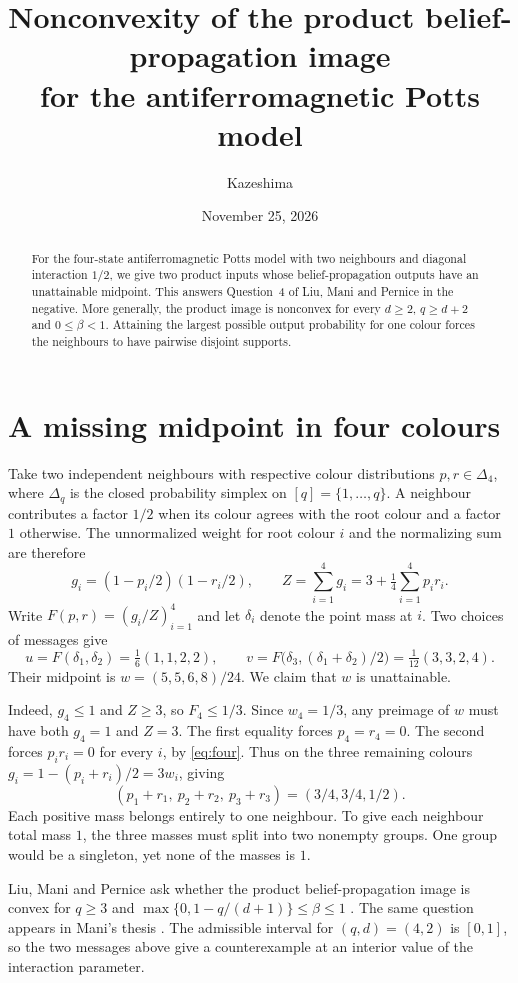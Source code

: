\documentclass[10pt,reqno]{amsart}
\title[Nonconvexity of the product Potts BP image]{Nonconvexity of the product belief-propagation image\\
for the antiferromagnetic Potts model}
\author{Kazeshima}
\date{November 25, 2026}
\begin{document}
\begin{abstract}
For the four-state antiferromagnetic Potts model with two neighbours and
diagonal interaction $1/2$, we give two product inputs whose belief-propagation
outputs have an unattainable midpoint. This answers Question~4 of Liu, Mani
and Pernice in the negative. More generally, the product image is nonconvex
for every $d\ge2$, $q\ge d+2$ and $0\le\beta<1$. Attaining the largest
possible output probability for one colour forces the neighbours to have
pairwise disjoint supports.
\end{abstract}
\maketitle

\section{A missing midpoint in four colours}

Take two independent neighbours with respective colour distributions
$p,r\in\Delta_4$, where $\Delta_q$ is the closed probability simplex on
$[q]=\{1,\ldots,q\}$. A neighbour contributes a factor $1/2$ when its
colour agrees with the root colour and a factor $1$ otherwise. The
unnormalized weight for root colour $i$ and the normalizing sum are therefore
\begin{equation}\label{eq:four}
 g_i=(1-p_i/2)(1-r_i/2),\qquad
 Z=\sum_{i=1}^4g_i=3+\tfrac14\sum_{i=1}^4p_i r_i .
\end{equation}
Write $F(p,r)=(g_i/Z)_{i=1}^4$ and let $\delta_i$ denote the point mass at $i$.
Two choices of messages give
\[
 u=F(\delta_1,\delta_2)=\tfrac16(1,1,2,2),\qquad
 v=F\bigl(\delta_3,(\delta_1+\delta_2)/2\bigr)=\tfrac1{12}(3,3,2,4).
\]
Their midpoint is $w=(5,5,6,8)/24$. We claim that $w$ is unattainable.

Indeed, $g_4\le1$ and $Z\ge3$, so $F_4\le1/3$. Since $w_4=1/3$, any
preimage of $w$ must have both $g_4=1$ and $Z=3$. The first equality
forces $p_4=r_4=0$. The second forces $p_i r_i=0$ for every $i$, by
\eqref{eq:four}. Thus on the three remaining colours
$g_i=1-(p_i+r_i)/2=3w_i$, giving
\[
 (p_1+r_1,\ p_2+r_2,\ p_3+r_3)=(3/4,3/4,1/2).
\]
Each positive mass belongs entirely to one neighbour. To give each
neighbour total mass $1$, the three masses must split into two nonempty
groups. One group would be a singleton, yet none of the masses is $1$.

Liu, Mani and Pernice ask whether the product belief-propagation image is
convex for $q\ge3$ and $\max\{0,1-q/(d+1)\}\le\beta\le1$
\cite[Definition~2 and Question~4]{LMP}. The same question appears in
Mani's thesis \cite[Question~3.9.18]{Mani}. The admissible interval for
$(q,d)=(4,2)$ is $[0,1]$, so the two messages above give a counterexample
at an interior value of the interaction parameter.
\end{document}

